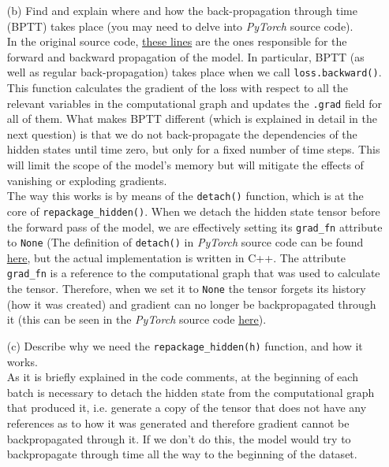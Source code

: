 \documentclass{article}
\begin{document}
\begin{itemize}
    \item[(b)] Find and explain where and how the back-propagation through time (BPTT) takes place (you may need to delve into \emph{PyTorch} source code).\\
    In the original source code, \href{https://github.com/pytorch/examples/blob/master/word_language_model/main.py#L155-L159}{these lines} are the ones responsible for the forward and backward propagation of the model. In particular, BPTT (as well as regular back-propagation) takes place when we call \texttt{loss.backward()}. This function calculates the gradient of the loss with respect to all the relevant variables in the computational graph and updates the \texttt{.grad} field for all of them. What makes BPTT different (which is explained in detail in the next question) is that we do not back-propagate the dependencies of the hidden states until time zero, but only for a fixed number of time steps. This will limit the scope of the model's memory but will mitigate the effects of vanishing or exploding gradients.\\
    The way this works is by means of the \texttt{detach()} function, which is at the core of \texttt{repackage\_hidden()}. When we detach the hidden state tensor before the forward pass of the model, we are effectively setting its \texttt{grad\_fn} attribute to \texttt{None} (The definition of \texttt{detach()} in \emph{PyTorch} source code can be found \href{https://github.com/pytorch/pytorch/blob/master/torch/tensor.py#L176-L179}{here}, but the actual implementation is written in C++. The attribute \texttt{grad\_fn} is a reference to the computational graph that was used to calculate the tensor. Therefore, when we set it to \texttt{None} the tensor forgets its history (how it was created) and gradient can no longer be backpropagated through it (this can be seen in the \emph{PyTorch} source code \href{https://github.com/pytorch/pytorch/blob/master/torch/nn/modules/module.py#L505-L510}{here}).  
    \item[(c)] Describe why we need the \texttt{repackage\_hidden(h)} function, and how it works.\\
    As it is briefly explained in the code comments, at the beginning of each batch is necessary to detach the hidden state from the computational graph that produced it, i.e. generate a copy of the tensor that does not have any references as to how it was generated and therefore gradient cannot be backpropagated through it. If we don't do this, the model would try to backpropagate through time all the way to the beginning of the dataset.\\

\end{itemize}
\end{document}
